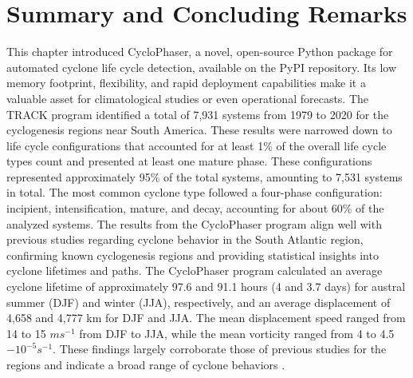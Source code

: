 \section{Summary and Concluding Remarks}

This chapter introduced CycloPhaser, a novel, open-source Python package for automated cyclone life cycle detection, available on the PyPI repository. Its low memory footprint, flexibility, and rapid deployment capabilities make it a valuable asset for climatological studies or even operational forecasts. The TRACK program identified a total of 7,931 systems from 1979 to 2020 for the cyclogenesis regions near South America. These results were narrowed down to life cycle configurations that accounted for at least 1\% of the overall life cycle types count and presented at least one mature phase. These configurations represented approximately 95\% of the total systems, amounting to 7,531 systems in total. The most common cyclone type followed a four-phase configuration: incipient, intensification, mature, and decay, accounting for about 60\% of the analyzed systems. The results from the CycloPhaser program align well with previous studies regarding cyclone behavior in the South Atlantic region, confirming known cyclogenesis regions and providing statistical insights into cyclone lifetimes and paths. The CycloPhaser program calculated an average cyclone lifetime of approximately 97.6 and 91.1 hours (4 and 3.7 days) for austral summer (DJF) and winter (JJA), respectively, and an average displacement of 4,658 and 4,777 km for DJF and JJA. The mean displacement speed ranged from 14 to 15 \(m s^{-1}\) from DJF to JJA, while the mean vorticity ranged from 4 to 4.5 \(-10^{-5} s^{-1}\). These findings largely corroborate those of previous studies for the regions and indicate a broad range of cyclone behaviors \citep{simmonds1999southern, hoskins2005new, mendes2010climatology, reboita2010regimes, gramcianinov2019properties, gramcianinov2020analysis, crespo2023assessment}.

